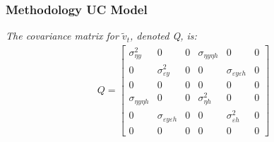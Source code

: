 \documentclass[10pt]{beamer}
\begin{document}



\begin{frame}[label=CovarMatrix]  
	\frametitle{Methodology UC Model}
	
	
		\textit{The covariance matrix for $\tilde{v}_t$, denoted Q, is: }
\begin{align}
	Q = 
	\begin{bmatrix}
		\sigma^2_{\eta y}	& 0	 &0 & \sigma_{\eta y \eta h}	& 0	& 0	\\
		0	& \sigma^2_{\varepsilon y}	& 0	& 0	& \sigma_{\varepsilon y \varepsilon h}	& 0	\\
		0	&	0	& 0 & 0 & 0 & 0	\\
		\sigma_{\eta y \eta h}	& 0	& 0	& \sigma^2_{\eta h}	& 0	& 0	\\
		0	& \sigma_{\varepsilon y \varepsilon h}	& 0	& 0	& \sigma^2_{\varepsilon h}		& 0	\\
		0	&0	& 0	& 0
		& 0	& 0
	\end{bmatrix}
\end{align}
	

\hyperlink{Reg_US}{} 	
	
\end{frame}
\end{document}
